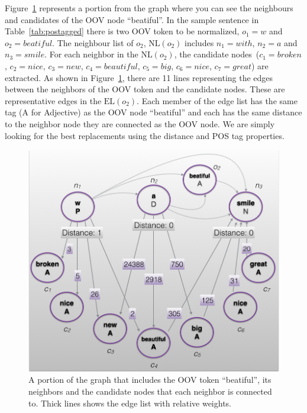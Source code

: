 \documentclass[a4paper,onesided,12pt]{report}
\begin{document}
Figure~\ref{fig:edgeWeight} represents a portion from the graph where you can see the neighbours  and candidates of the OOV node ``beatiful''. In the sample sentence in Table~\ref{tab:postagged} there is two OOV token to be normalized, $o_1=w$ and $o_2=beatiful$. The neighbour list of $o_2$, $\text{NL}(o_2)$ includes  $n_1=with$, $n_2=a$ and $n_3=smile$. For each neighbor in the $\text{NL}(o_2)$, the candidate nodes~($c_1=broken$, $c_2=nice$, $c_3=new$, $c_4=beautiful$, $c_5=big$, $c_6=nice$, $c_7=great$) are extracted. As shown in Figure~\ref{fig:edgeWeight}, there are 11 lines representing the edges between the neighbors of the OOV token and the candidate nodes. These are representative edges in the $\text{EL}(o_2)$. Each member of the edge list has the same tag (A for Adjective) as the OOV node ``beatiful'' and each has the same distance to the neighbor node they are connected as the OOV node. We are simply looking for the best replacements using the distance and POS tag properties.

\begin{figure}[htb]
\begin{center}
\includegraphics[scale=0.5]{fig/edgeWeight}
\caption{A portion of the graph that includes the OOV token ``beatiful'', its neighbors and the candidate nodes that each neighbor is connected to. Thick lines shows the edge list with relative weights.}
\label{fig:edgeWeight}
\end{center}
\end{figure}
\end{document}
